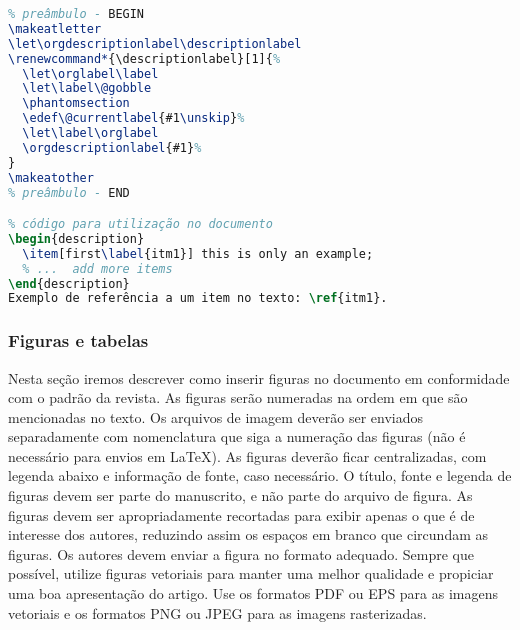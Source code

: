 \documentclass[portuguese]{textolivre}
\begin{document}
\begin{lstlisting}[language=tex, label=lst-refdescitem, caption={Código para ser inserido para realizar referências atravé do rótulo de itens de uma lista descritiva.}]
% inserir o código abaixo no preâmbulo do documento
% preâmbulo - BEGIN
\makeatletter
\let\orgdescriptionlabel\descriptionlabel
\renewcommand*{\descriptionlabel}[1]{%
  \let\orglabel\label
  \let\label\@gobble
  \phantomsection
  \edef\@currentlabel{#1\unskip}%
  \let\label\orglabel
  \orgdescriptionlabel{#1}%
}
\makeatother
% preâmbulo - END

% código para utilização no documento
\begin{description}
  \item[first\label{itm1}] this is only an example;
  % ...  add more items
\end{description}
Exemplo de referência a um item no texto: \ref{itm1}.

\end{lstlisting} %



\subsubsection{Figuras e tabelas}\label{sec-figuras-tabelas}
Nesta seção iremos descrever como inserir figuras no documento em conformidade com o padrão da revista.
As figuras serão numeradas na ordem em que são mencionadas no texto. Os arquivos de imagem deverão
ser enviados separadamente com nomenclatura que siga a numeração das figuras (não é necessário para envios em \LaTeX{}).
As figuras deverão ficar centralizadas, com legenda abaixo e informação de fonte, caso necessário.
O título, fonte e legenda de figuras devem ser parte do manuscrito, e não parte do arquivo de figura.
As figuras devem ser apropriadamente recortadas para exibir apenas o que é de interesse dos autores,
reduzindo assim os espaços em branco que circundam as figuras.
Os autores devem enviar a figura no formato adequado.
Sempre que possível, utilize figuras vetoriais para manter uma melhor qualidade e propiciar uma boa apresentação do artigo.
Use os formatos PDF ou EPS para as imagens vetoriais e os formatos PNG ou JPEG para as imagens rasterizadas.
\end{document}
